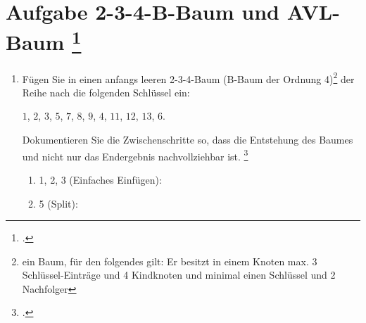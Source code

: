 \documentclass{bschlangaul-aufgabe}
\begin{document}

\section{Aufgabe 2-3-4-B-Baum und AVL-Baum
\footcite[entnommen aus Algorithmen und
Datenstrukturen, Übungsblatt 6, Universität Würzburg, Aufgabe 9]{aud:pu:7}}

\begin{enumerate}


\item Fügen Sie in einen anfangs leeren 2-3-4-Baum (B-Baum der Ordnung
4)\footnote{ein Baum, für den folgendes gilt: Er besitzt in einem Knoten
max. 3 Schlüssel-Einträge und 4 Kindknoten und minimal einen Schlüssel
und 2 Nachfolger} der Reihe nach die folgenden Schlüssel ein:

\bigskip

\centerline{$1$, $2$, $3$, $5$, $7$, $8$, $9$, $4$, $11$, $12$, $13$, $6$.}

\bigskip

Dokumentieren Sie die Zwischenschritte so,
dass die Entstehung des Baumes und nicht nur das Endergebnis
nachvollziehbar ist. \footcite[Staatsexamen Theoretische Informatik,
Algorithmen und Datenstrukturen, Realschulen, Frühjahr 2011, Thema 1
Aufgabe 3]{examen:46115:2011:03}

\begin{bAntwort}
\begin{multicols}{2}
\begin{enumerate}

%

\item 1, 2, 3 (Einfaches Einfügen):


%

\item 5 (Split):



\end{enumerate}
\end{multicols}
\end{bAntwort}
\end{enumerate}
\end{document}
